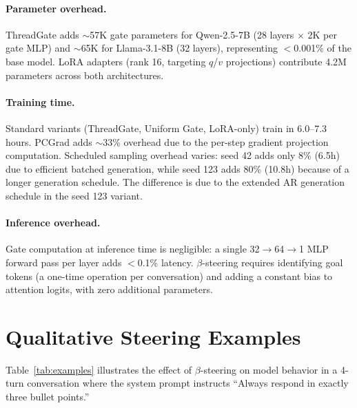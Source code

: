 \paragraph{Parameter overhead.} ThreadGate adds ${\sim}$57K gate parameters for Qwen-2.5-7B (28 layers $\times$ 2K per gate MLP) and ${\sim}$65K for Llama-3.1-8B (32 layers), representing $<$0.001\% of the base model. LoRA adapters (rank 16, targeting $q$/$v$ projections) contribute 4.2M parameters across both architectures.

\paragraph{Training time.} Standard variants (ThreadGate, Uniform Gate, LoRA-only) train in 6.0--7.3 hours. PCGrad adds ${\sim}$33\% overhead due to the per-step gradient projection computation. Scheduled sampling overhead varies: seed 42 adds only 8\% (6.5h) due to efficient batched generation, while seed 123 adds 80\% (10.8h) because of a longer generation schedule. The difference is due to the extended AR generation schedule in the seed 123 variant.

\paragraph{Inference overhead.} Gate computation at inference time is negligible: a single 32$\to$64$\to$1 MLP forward pass per layer adds $<$0.1\% latency. $\beta$-steering requires identifying goal tokens (a one-time operation per conversation) and adding a constant bias to attention logits, with zero additional parameters.

\section{Qualitative Steering Examples}\label{sec:appendix-examples}

Table~\ref{tab:examples} illustrates the effect of $\beta$-steering on model behavior in a 4-turn conversation where the system prompt instructs ``Always respond in exactly three bullet points.''

